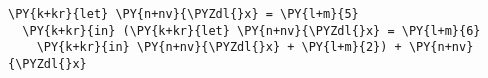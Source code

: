 \begin{Verbatim}[commandchars=\\\{\}]
\PY{k+kr}{let} \PY{n+nv}{\PYZdl{}x} = \PY{l+m}{5}
  \PY{k+kr}{in} (\PY{k+kr}{let} \PY{n+nv}{\PYZdl{}x} = \PY{l+m}{6}
    \PY{k+kr}{in} \PY{n+nv}{\PYZdl{}x} + \PY{l+m}{2}) + \PY{n+nv}{\PYZdl{}x}
\end{Verbatim}
